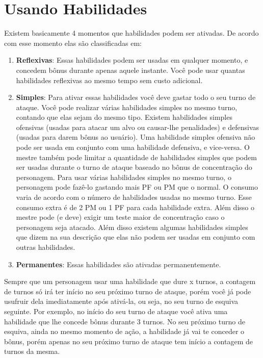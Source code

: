\section{Usando Habilidades}

Existem basicamente 4 momentos que habilidades podem ser ativadas. De acordo com esse momento elas são classificadas em:

\begin{enumerate}

\item \textbf{Reflexivas}: Essas habilidades podem ser usadas em qualquer momento, e concedem bônus durante apenas aquele instante. Você pode usar quantas habilidades reflexivas ao mesmo tempo sem custo adicional.

\item \textbf{Simples}: Para ativar essas habilidades você deve gastar todo o seu turno de ataque. Você pode realizar várias habilidades simples no mesmo turno, contando que elas sejam do mesmo tipo. Existem habilidades simples ofensivas (usadas para atacar um alvo ou causar-lhe penalidades) e defensivas (usadas para darem bônus ao usuário). Uma habilidade simples ofensiva não pode ser usada em conjunto com uma habilidade defensiva, e vice-versa. O mestre também pode limitar a quantidade de habilidades simples que podem ser usadas durante o turno de ataque baseado no bônus de concentração do personagem. Para usar várias habilidades simples no mesmo turno, o personagem pode fazê-lo gastando mais PF ou PM que o normal. O consumo varia de acordo com o número de habilidades usadas no mesmo turno. Esse consumo extra é de 2 PM ou 1 PF para cada habilidade extra. Além disso o mestre pode (e deve) exigir um teste maior de concentração caso o personagem seja atacado. Além disso existem algumas habilidades simples que dizem na sua descrição que elas não podem ser usadas em conjunto com outras habilidades.

\item \textbf{Permanentes}: Essas habilidades são ativadas permanentemente. 

\end{enumerate}

Sempre que um personagem usar uma habilidade que dure x turnos, a contagem de turnos só irá ter início no seu próximo turno de ataque, porém você já pode usufruir dela imediatamente após ativá-la, ou seja, no seu turno de esquiva seguinte. Por exemplo, no início do seu turno de ataque você ativa uma habilidade que lhe concede bônus durante 3 turnos. No seu próximo turno de esquiva, ainda no mesmo momento de ação, a habilidade já vai te conceder o bônus, porém apenas no seu próximo turno de ataque tem início a contagem de turnos da mesma. 

